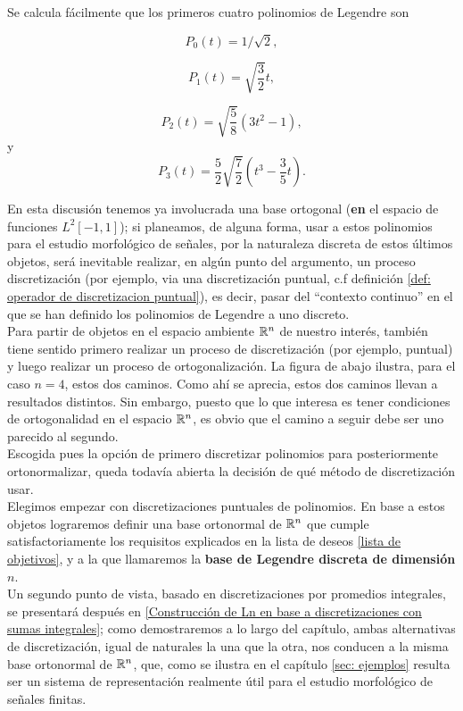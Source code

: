 Se calcula fácilmente que los primeros cuatro 
polinomios de Legendre son

\[
P_{0}(t) = 1/\sqrt{2},
\]

\[
P_{1}(t) = \sqrt{\frac{3}{2}}t,
\]

\[
P_{2}(t) = \sqrt{\frac{5}{8}}\left( 3t^{2}-1 \right),
\]
y
\[
P_{3}(t) = \frac{5}{2} \sqrt{\frac{7}{2}}\left( t^{3}- \frac{3}{5}t\right).
\]

En esta discusión tenemos ya involucrada una base ortogonal
(\textbf{en} el espacio de funciones $L^{2}[-1,1]$);
si planeamos, de alguna forma, usar a estos polinomios
para el estudio morfológico de señales, por la naturaleza
discreta de estos últimos objetos, será
inevitable realizar, en algún punto 
del argumento, un proceso discretización
(por ejemplo, 
via una discretización
puntual, c.f definición \ref{def: operador de discretizacion puntual}), es decir,
pasar del ``contexto continuo'' en el que se han
definido los polinomios de Legendre a uno discreto. \\

Para partir de
objetos en el espacio ambiente
$\mathbb{R}^{n}$ de nuestro interés,
también tiene sentido primero realizar
un proceso de discretización (por ejemplo, 
puntual) y luego realizar
un proceso de ortogonalización. La figura
de abajo
ilustra, para el caso $n=4$, estos dos caminos.
Como ahí se aprecia, estos dos caminos llevan 
a resultados distintos. Sin embargo, puesto que lo
que interesa es tener condiciones de ortogonalidad
en el espacio $\mathbb{R}^{n}$, es obvio que 
el camino a seguir debe ser uno parecido al segundo. \\


Escogida pues la opción de primero 
discretizar polinomios para posteriormente
ortonormalizar, queda todavía abierta
la decisión de qué método de discretización usar. \\

Elegimos empezar
con discretizaciones puntuales de polinomios.
En base a estos objetos lograremos definir
una base ortonormal de $\mathbb{R}^{n}$ que cumple satisfactoriamente
los requisitos explicados en la lista de deseos
\ref{lista de objetivos}, y a la que llamaremos
la \textbf{base de Legendre discreta de dimensión $n$}. \\

Un segundo punto de vista, basado
en discretizaciones por promedios integrales,
se presentará después en
\ref{Construcción de Ln en base a discretizaciones con sumas integrales}; 
como demostraremos a lo largo del capítulo, 
ambas alternativas
de discretización, igual de naturales la una que la otra, nos
conducen a la misma base ortonormal de $\mathbb{R}^{n}$,
que, como se ilustra en el capítulo \ref{sec: ejemplos} 
resulta ser un sistema de representación
realmente útil para el estudio morfológico de señales finitas.

